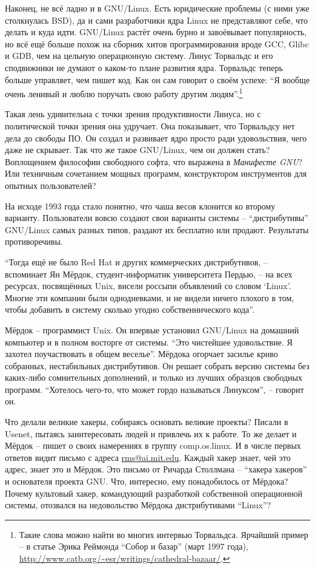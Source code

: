 Наконец, не всё ладно и в GNU/Linux. Есть юридические проблемы (с ними уже столкнулась BSD), да и сами разработчики ядра Linux не представляют себе, что делать и куда идти. GNU/Linux растёт очень бурно и завоёвывает популярность, но всё ещё больше похож на сборник хитов программирования вроде GCC, Glibc и GDB, чем на цельную операционную систему. Линус Торвальдс и его сподвижники не думают о каком-то плане развития ядра. Торвальдс теперь больше управляет, чем пишет код. Как он сам говорит о своём успехе: \enquote{Я вообще очень ленивый и люблю поручать свою работу другим людям}.\footnote{Такие слова можно найти во многих интервью Торвальдса. Ярчайший пример -- в статье Эрика Реймонда \enquote{Собор и базар} (март 1997 года), \url{http://www.catb.org/~esr/writings/cathedral-bazaar/}.}

Такая лень удивительна с точки зрения продуктивности Линуса, но с политической точки зрения она удручает. Она показывает, что Торвальдсу нет дела до свободы ПО. Он создал и развивает ядро просто ради удовольствия, чего даже не скрывает. Так что же такое GNU/Linux, чем он должен стать? Воплощением философии свободного софта, что выражена в \textit{Манифесте GNU}? Или техничным сочетанием мощных программ, конструктором инструментов для опытных пользователей?

На исходе 1993 года стало понятно, что чаша весов клонится ко второму варианту. Пользователи вовсю создают свои варианты системы -- \enquote{дистрибутивы} GNU/Linux самых разных типов, раздают их бесплатно или продают. Результаты противоречивы.

\enquote{Тогда ещё не было Red Hat и других коммерческих дистрибутивов, -- вспоминает Ян Мёрдок, студент-информатик университета Пердью, -- на всех ресурсах, посвящённых Unix, висели россыпи объявлений со словом \enquote{Linux}. Многие эти компании были однодневками, и не видели ничего плохого в том, чтобы добавить в систему сколько угодно собственнического кода}.

Мёрдок -- программист Unix. Он впервые установил GNU/Linux на домашний компьютер и в полном восторге от системы. \enquote{Это чистейшее удовольствие. Я захотел поучаствовать в общем веселье}. Мёрдока огорчает засилье криво собранных, нестабильных дистрибутивов. Он решает собрать версию системы без каких-либо сомнительных дополнений, и только из лучших образцов свободных программ. \enquote{Хотелось чего-то, что может гордо называться Линуксом}, -- говорит он.

Что делали великие хакеры, собираясь основать великие проекты? Писали в Usenet, пытаясь заинтересовать людей и привлечь их к работе. То же делает и Мёрдок -- пишет о своих намерениях в группу comp.os.linux. И в числе первых ответов видит письмо с адреса \url{rms@ai.mit.edu}. Каждый хакер знает, чей это адрес, знает это и Мёрдок. Это письмо от Ричарда Столлмана -- \enquote{хакера хакеров} и основателя проекта GNU. Что, интересно, ему понадобилось от Мёрдока? Почему культовый хакер, командующий разработкой собственной операционной системы, отозвался на недовольство Мёрдока дистрибутивами \enquote{Linux}?

